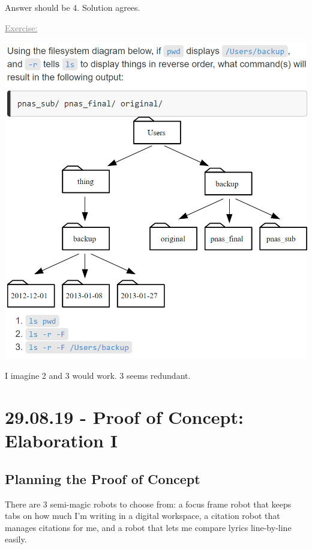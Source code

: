 \documentclass[12pt]{article}
\begin{document}
\begin{addmargin}[1cm]{0cm}
Answer should be 4. Solution agrees.

\newpage
\textcolor{gray}{\underline{Exercise:}\vspace{0.5em}}
\begin{center}
\vspace{1em}
\includegraphics[scale=1]{imgreadingcomprehension.PNG}
\end{center}

I imagine 2 and 3 would work. 3 seems redundant.
\end{addmargin}

\newpage\section{29.08.19 - Proof of Concept: Elaboration I}

\subsection{Planning the Proof of Concept}

There are 3 semi-magic robots to choose from: a focus frame robot that keeps tabs on how much I'm writing in a digital workspace, a citation robot that manages citations for me, and a robot that lets me compare lyrics line-by-line easily. 
\end{document}
